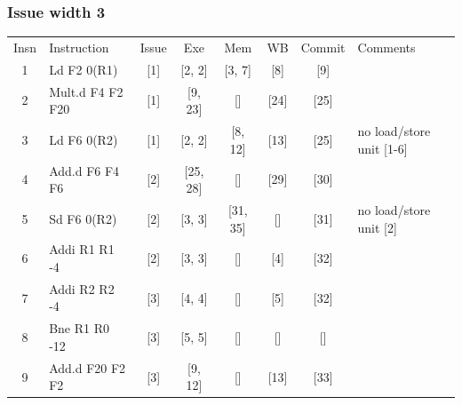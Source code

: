 \documentclass[11pt]{article}
\begin{document}
\subsubsection*{Issue width 3}
\begin{center}
\scriptsize
\setlength{\tabcolsep}{8pt}
\renewcommand{\arraystretch}{1.35}
\begin{tabular}{clccccc>{\raggedright\arraybackslash}p{1.4in}}
Insn & Instruction & Issue & Exe & Mem & WB & Commit & Comments \\
1 & Ld F2 0(R1) & [1] & [2, 2] & [3, 7] & [8] & [9] &  \\
2 & Mult.d F4 F2 F20 & [1] & [9, 23] & [] & [24] & [25] &  \\
3 & Ld F6 0(R2) & [1] & [2, 2] & [8, 12] & [13] & [25] & no load/store unit [1-6] \\
4 & Add.d F6 F4 F6 & [2] & [25, 28] & [] & [29] & [30] &  \\
5 & Sd F6 0(R2) & [2] & [3, 3] & [31, 35] & [] & [31] & no load/store unit [2] \\
6 & Addi R1 R1 -4 & [2] & [3, 3] & [] & [4] & [32] &  \\
7 & Addi R2 R2 -4 & [3] & [4, 4] & [] & [5] & [32] &  \\
8 & Bne R1 R0 -12 & [3] & [5, 5] & [] & [] & [] &  \\
9 & Add.d F20 F2 F2 & [3] & [9, 12] & [] & [13] & [33] &  \\
\end{tabular}
\end{center}
\end{document}
